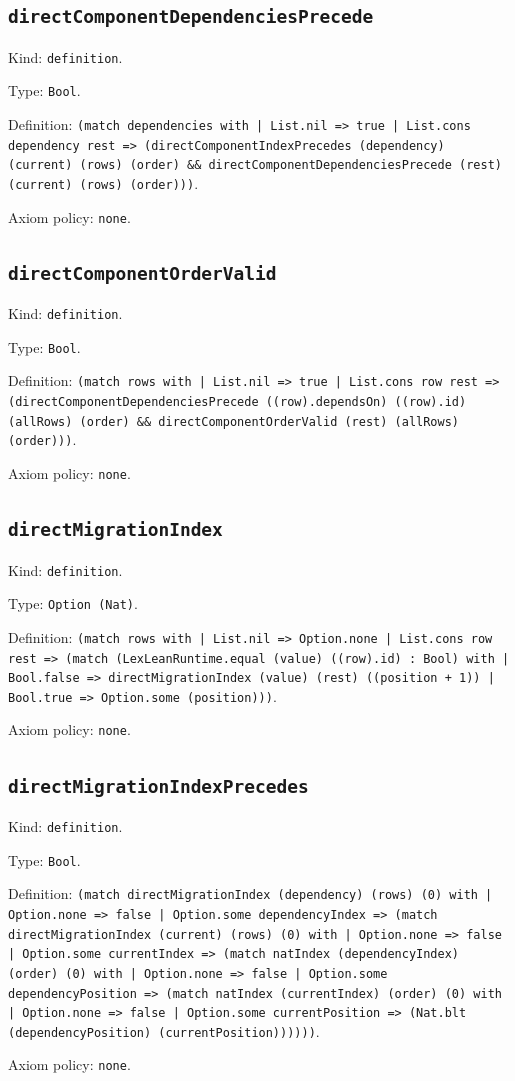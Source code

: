 \documentclass[11pt]{article}
\begin{document}
\subsection*{\texttt{directComponentDependenciesPrecede}}
\noindent Kind: \texttt{definition}.\par
\noindent Type: \texttt{Bool}.\par
\noindent Definition: \texttt{(match dependencies with | List.nil => true | List.cons dependency rest => (directComponentIndexPrecedes (dependency) (current) (rows) (order) \&\& directComponentDependenciesPrecede (rest) (current) (rows) (order)))}.\par
\noindent Axiom policy: \texttt{none}.\par
\subsection*{\texttt{directComponentOrderValid}}
\noindent Kind: \texttt{definition}.\par
\noindent Type: \texttt{Bool}.\par
\noindent Definition: \texttt{(match rows with | List.nil => true | List.cons row rest => (directComponentDependenciesPrecede ((row).dependsOn) ((row).id) (allRows) (order) \&\& directComponentOrderValid (rest) (allRows) (order)))}.\par
\noindent Axiom policy: \texttt{none}.\par
\subsection*{\texttt{directMigrationIndex}}
\noindent Kind: \texttt{definition}.\par
\noindent Type: \texttt{Option (Nat)}.\par
\noindent Definition: \texttt{(match rows with | List.nil => Option.none | List.cons row rest => (match (LexLeanRuntime.equal (value) ((row).id) : Bool) with | Bool.false => directMigrationIndex (value) (rest) ((position + 1)) | Bool.true => Option.some (position)))}.\par
\noindent Axiom policy: \texttt{none}.\par
\subsection*{\texttt{directMigrationIndexPrecedes}}
\noindent Kind: \texttt{definition}.\par
\noindent Type: \texttt{Bool}.\par
\noindent Definition: \texttt{(match directMigrationIndex (dependency) (rows) (0) with | Option.none => false | Option.some dependencyIndex => (match directMigrationIndex (current) (rows) (0) with | Option.none => false | Option.some currentIndex => (match natIndex (dependencyIndex) (order) (0) with | Option.none => false | Option.some dependencyPosition => (match natIndex (currentIndex) (order) (0) with | Option.none => false | Option.some currentPosition => (Nat.blt (dependencyPosition) (currentPosition))))))}.\par
\noindent Axiom policy: \texttt{none}.\par
\end{document}
